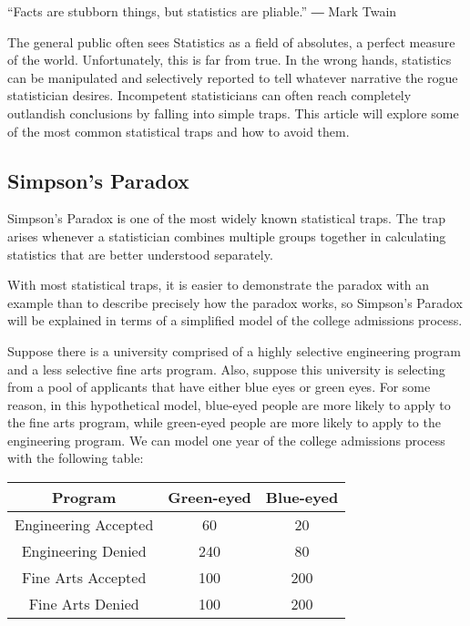 
“Facts are stubborn things, but statistics are pliable.”
― Mark Twain

The general public often sees Statistics as a field of absolutes, a perfect measure of the world. Unfortunately, this is far from true. In the wrong hands, statistics can be manipulated and selectively reported to tell whatever narrative the rogue statistician desires. Incompetent statisticians can often reach completely outlandish conclusions by falling into simple traps. This article will explore some of the most common statistical traps and how to avoid them.

\subsection*{Simpson’s Paradox}

Simpson’s Paradox is one of the most widely known statistical traps. The trap arises whenever a statistician combines multiple groups together in calculating statistics that are better understood separately.

With most statistical traps, it is easier to demonstrate the paradox with an example than to describe precisely how the paradox works, so Simpson’s Paradox will be explained in terms of a simplified model of the college admissions process.

Suppose there is a university comprised of a highly selective engineering program and a less selective fine arts program. Also, suppose this university is selecting from a pool of applicants that have either blue eyes or green eyes. For some reason, in this hypothetical model, blue-eyed people are more likely to apply to the fine arts program, while green-eyed people are more likely to apply to the engineering program. We can model one year of the college admissions process with the following table:

\begin{center}
\begin{tabular}{c c c}
\toprule
Program & Green-eyed & Blue-eyed \\
\midrule
Engineering Accepted & 60 & 20 \\
Engineering Denied & 240 & 80 \\
Fine Arts Accepted & 100 & 200 \\
Fine Arts Denied & 100 & 200 \\
\bottomrule
\end{tabular}
\end{center}

